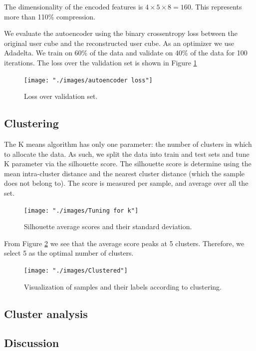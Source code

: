 \documentclass{article}
\begin{document}
The dimensionality of the encoded features is $4 \times 5 \times 8 = 160$. This represents more than 110\% compression. 

We evaluate the autoencoder using the binary crossentropy loss between the original user cube and the reconstructed user cube. As an optimizer we use Adadelta. We train on 60\% of the data and validate on 40\% of the data for 100 iterations. The loss over the validation set is shown in Figure \ref{fig:clustering/loss}

\begin{figure}[H]
  \centering
  \texttt{[image: "./images/autoencoder loss"]}
  \caption{Loss over validation set.}
  \label{fig:clustering/loss}
\end{figure}

\subsection{Clustering}
The K means algorithm has only one parameter: the number of clusters in which to allocate the data. As such, we split the data into train and test sets and tune K parameter via the silhouette score. The silhouette score is determine using the mean intra-cluster distance and the nearest cluster distance (which the sample does not belong to). The score is measured per sample, and average over all the set. 

\begin{figure}[H]
  \centering
  \texttt{[image: "./images/Tuning for k"]}
  \caption{Silhouette average scores and their standard deviation.}
  \label{fig:clustering/tuning}
\end{figure}

From Figure \ref{fig:clustering/tuning} we see that the average score peaks at 5 clusters. Therefore, we select 5 as the optimal number of clusters. 

\begin{figure}[H]
  \centering
  \texttt{[image: "./images/Clustered"]}
  \caption{Visualization of samples and their labels according to clustering.}
  \label{fig:clustering/tsne}
\end{figure}

\subsection{Cluster analysis}



\subsection{Discussion}
\end{document}
